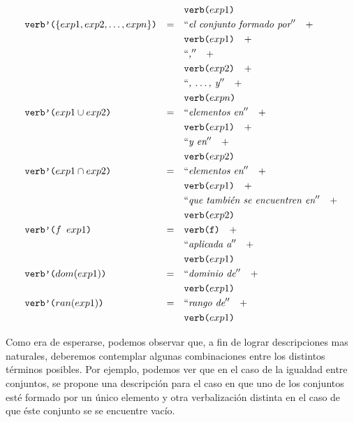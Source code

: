\begin{align*}
& &											 		& \nlgfun{verb($exp1$)} \\
&\nlgfun{verb'($\{exp1, exp2, \ldots ,expn\}$)} & = \quad & \nlgtext{el conjunto formado por} \quad +  \\
& &											 		& \nlgfun{verb($exp1$)} \quad +  \\
& &											 		& \nlgtext{,} \quad +  \\
& &											 		& \nlgfun{verb($exp2$)} \quad +  \\
& &											 		& \nlgtext{, \ldots , y} \quad +  \\
& &											 		& \nlgfun{verb($expn$)} \\
&\nlgfun{verb'($exp1 \cup exp2$)} & = \quad & \nlgtext{elementos en} \quad +  \\
& &											 		& \nlgfun{verb($exp1$)} \quad +  \\
& &											 		& \nlgtext{y en} \quad +  \\
& &											 		& \nlgfun{verb($exp2$)} \\
&\nlgfun{verb'($exp1 \cap exp2$)} & = \quad & \nlgtext{elementos en} \quad +  \\
& &											 		& \nlgfun{verb($exp1$)} \quad +  \\
& &											 		& \nlgtext{que también se encuentren en} \quad +  \\
& &											 		& \nlgfun{verb($exp2$)} \\
&\nlgfun{verb'($f~exp1$)} & = \quad & \nlgfun{verb(f)} \quad +  \\
& &											 		& \nlgtext{aplicada a} \quad +  \\
& &											 		& \nlgfun{verb($exp1$)} \\
&\nlgfun{verb'($dom(exp1)$)} & = \quad & \nlgtext{dominio de} \quad +  \\
& &											 		& \nlgfun{verb($exp1$)} \\
&\nlgfun{verb'($ran(exp1)$)} & = \quad & \nlgtext{rango de} \quad +  \\
& &											 		& \nlgfun{verb($exp1$)} \\
\end{align*} 

\bigskip
Como era de esperarse, podemos observar que, a fin de lograr descripciones mas naturales, deberemos contemplar algunas combinaciones entre los distintos términos posibles. Por ejemplo, podemos ver que en el caso de la igualdad entre conjuntos, se propone una descripción para el caso en que uno de los conjuntos esté formado por un único elemento y otra verbalización distinta en el caso de que éste conjunto se se encuentre vacío.

